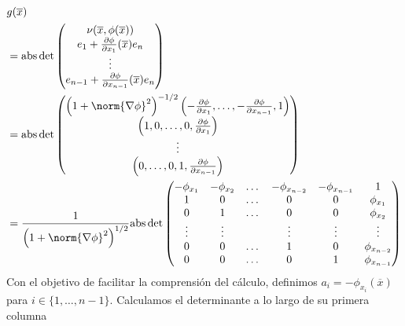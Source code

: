 \documentclass{report}
\theoremstyle{definition}
\theoremstyle{remark}
\begin{document}
  \begin{align}
    &g(\overline{x})
    \\
    &=
    \text{abs} \det
    \begin{pmatrix}
      \nu(\overline{x}, \phi(\overline{x}))
      \\
      e_1
      +
      \frac{\partial \phi}{\partial x_1}(\overline{x})
      e_n
      \\
      \vdots
      \\
      e_{n - 1}
      +
      \frac{\partial \phi}{\partial x_{n - 1}}(\overline{x})
      e_n
    \end{pmatrix}
    \\
    &=
    \text{abs} \det
    \begin{pmatrix}
      \left( 1 + \norm{\nabla \phi}^2 \right)^{- 1 / 2}
    \left(
      - \frac{\partial \phi}{\partial x_1}, \dots, - \frac{\partial \phi}{\partial x_{n - 1}},
      1
    \right)
      \\
      \left(
        1,
        0, \dots, 0,
        \frac{\partial \phi}{\partial x_1}
      \right)
      \\
      \vdots
      \\
      \left(
        0, \dots, 0,
        1,
        \frac{\partial \phi}{\partial x_{n - 1}}
      \right)
    \end{pmatrix}
    \\
    &=
    \frac{1}{\left( 1 + \norm{\nabla \phi}^2 \right)^{1/2}}
    \text{abs} \det
    \begin{pmatrix}
      - \phi_{x_1}
      &- \phi_{x_2}
      &\dots
      &- \phi_{x_{n - 2}}
      &- \phi_{x_{n - 1}}
      &1
      \\
      1
      &0
      &\dots
      &0
      &0
      &\phi_{x_1}
      \\
      0
      &1
      &\dots
      &0
      &0
      &\phi_{x_2}
      \\
      \vdots
      &\vdots
      &
      &\vdots
      &\vdots
      &\vdots
      \\
      0
      &0
      &\dots
      &1
      &0
      &\phi_{x_{n - 2}}
      \\
      0
      &0
      &\dots
      &0
      &1
      &\phi_{x_{n - 1}}
    \end{pmatrix}
  \end{align}
  Con el objetivo de facilitar la comprensión del cálculo, definimos \(a_i = - \phi_{x_i} (\overline{x})\) para \(i \in \{1, \dots, n - 1\}\).
  Calculamos el determinante a lo largo de su primera columna
\end{document}
